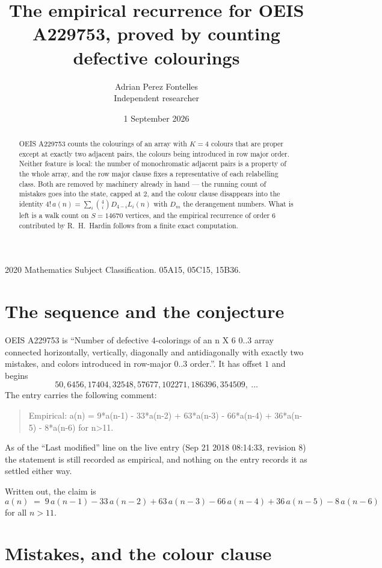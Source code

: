 \documentclass[11pt,a4paper]{article}
\title{The empirical recurrence for OEIS A229753, proved by counting defective colourings}
\author{Adrian Perez Fontelles\\ \small Independent researcher}
\date{1 September 2026}
\theoremstyle{plain}
\theoremstyle{definition}
\begin{document}
\maketitle

\begin{abstract}
OEIS A229753 counts the colourings of an array with $K=4$ colours that are proper except at
exactly two adjacent pairs, the colours being introduced in row
major order. Neither feature is local: the number of monochromatic adjacent pairs is a
property of the whole array, and the row major clause fixes a representative of each
relabelling class. Both are removed by machinery already in hand --- the running count of
mistakes goes into the state, capped at $2$, and the colour clause disappears into the
identity $4!\,a(n)=\sum_i\binom{4}{i}D_{4-i}L_i(n)$ with $D_m$ the derangement
numbers. What is left is a walk count on $S=14670$ vertices, and the empirical recurrence of
order $6$ contributed by R.~H.~Hardin follows from a finite exact computation.
\end{abstract}

\noindent\small 2020 Mathematics Subject Classification. 05A15, 05C15, 15B36.\normalsize

\section{The sequence and the conjecture}

OEIS A229753 is ``Number of defective 4-colorings of an n X 6 0..3 array connected horizontally, vertically, diagonally and antidiagonally with exactly two mistakes, and colors introduced in row-major 0..3 order.''. It has offset $1$ and begins
\[
50, 6456, 17404, 32548, 57677, 102271, 186396, 354509,\ \dots
\]
The entry carries the following comment:
\begin{quote}\small
Empirical: a(n) = 9*a(n-1) - 33*a(n-2) + 63*a(n-3) - 66*a(n-4) + 36*a(n-5) - 8*a(n-6) for n>11.
\end{quote}
As of the ``Last modified'' line on the live entry (Sep 21 2018 08:14:33, revision 8) the statement is
still recorded as empirical, and nothing on the entry records it as settled either way.

Written out, the claim is
\begin{equation}\label{eq:conj}
a(n)\;=\;9\,a(n-1) - 33\,a(n-2) + 63\,a(n-3) - 66\,a(n-4) + 36\,a(n-5) - 8\,a(n-6)
\end{equation}
for all $n>11$.

\section{Mistakes, and the colour clause}
\end{document}

